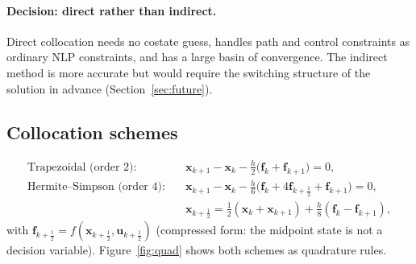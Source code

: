 \documentclass[11pt,a4paper]{article}
\begin{document}
\paragraph{Decision: direct rather than indirect.} Direct collocation needs no costate guess,
handles path and control constraints as ordinary NLP constraints, and has a large basin of
convergence. The indirect method is more accurate but would require the switching structure of the
solution in advance (Section~\ref{sec:future}).

\subsection{Collocation schemes}
\begin{align}
\text{Trapezoidal (order 2):}\quad & \mathbf{x}_{k+1} - \mathbf{x}_k - \tfrac{h}{2}\big(\mathbf{f}_k + \mathbf{f}_{k+1}\big) = 0, \\
\text{Hermite--Simpson (order 4):}\quad & \mathbf{x}_{k+1} - \mathbf{x}_k - \tfrac{h}{6}\big(\mathbf{f}_k + 4\mathbf{f}_{k+\frac12} + \mathbf{f}_{k+1}\big) = 0, \\
& \mathbf{x}_{k+\frac12} = \tfrac12(\mathbf{x}_k + \mathbf{x}_{k+1}) + \tfrac{h}{8}(\mathbf{f}_k - \mathbf{f}_{k+1}),
\end{align}
with $\mathbf{f}_{k+\frac12} = f(\mathbf{x}_{k+\frac12}, \mathbf{u}_{k+\frac12})$
(compressed form: the midpoint state is not a decision variable). Figure~\ref{fig:quad} shows both schemes as quadrature rules.
\end{document}
